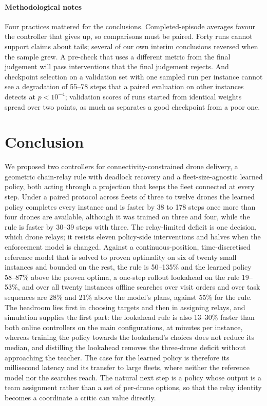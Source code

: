 \documentclass[final,5p,times,twocolumn]{elsarticle}
\begin{document}
\paragraph{Methodological notes}
Four practices mattered for the conclusions. Completed-episode averages favour the controller that
gives up, so comparisons must be paired. Forty runs cannot support claims about tails; several
of our own interim conclusions reversed when the sample grew. A pre-check that uses a different
metric from the final judgement will pass interventions that the final judgement rejects. And
checkpoint selection on a validation set with one sampled run per instance cannot see a
degradation of 55--78 steps that a paired evaluation on other instances detects at
$p < 10^{-4}$; validation scores of runs started from identical weights spread over two points,
as much as separates a good checkpoint from a poor one.

\section{Conclusion}
\label{sec:conclusion}

We proposed two controllers for connectivity-constrained drone delivery, a geometric chain-relay
rule with deadlock recovery and a fleet-size-agnostic learned policy, both acting through a
projection that keeps the fleet connected at every step. Under a paired protocol across fleets of
three to twelve drones the learned policy completes every instance and is faster by 38 to 178
steps once more than four drones are available, although it was trained on three and four, while the rule is faster by 30--39 steps with
three. The relay-limited deficit is one decision, which drone relays; it resists eleven policy-side
interventions and halves when the enforcement model is changed. Against a continuous-position,
time-discretised reference model that is solved to proven optimality on six of twenty small
instances and bounded on the rest, the rule is 50--135\% and the learned policy 58--87\% above the
proven optima, a one-step rollout lookahead on the rule 19--53\%, and over all twenty instances
offline searches over visit orders and over task sequences are 28\% and 21\% above the model's
plans, against 55\% for the rule. The
headroom lies first in choosing targets and then in assigning relays, and simulation supplies the
first part: the lookahead rule is also 13--30\% faster than both online controllers on the main
configurations, at minutes per instance, whereas training the policy towards the lookahead's
choices does not reduce its median, and distilling the lookahead removes the three-drone deficit
without approaching the teacher. The case for the learned policy is therefore its millisecond
latency and its transfer to large fleets, where neither the reference model nor the searches
reach. The natural next step is a policy whose output is a team assignment rather than a set of
per-drone options, so that the relay identity becomes a coordinate a critic can value directly.
\end{document}
